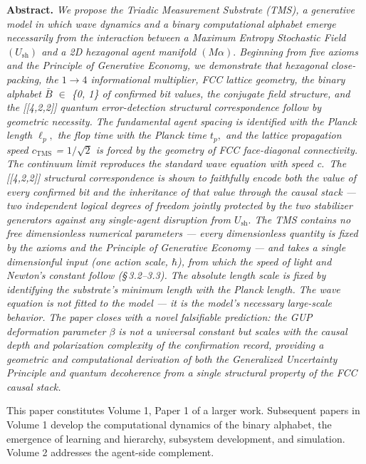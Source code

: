 \documentclass[11pt,oneside]{report}
\theoremstyle{definition}
\theoremstyle{remark}
\newenvironment{paperabstract}
  {\begin{center}\begin{minipage}{0.88\textwidth}\small
   \noindent\textbf{Abstract.}\itshape\space}
  {\end{minipage}\end{center}\vspace{0.4em}}
\begin{document}
\begin{paperabstract}
We propose the Triadic Measurement Substrate (TMS), a generative model
in which wave dynamics and a binary computational alphabet emerge
necessarily from the interaction between a Maximum Entropy Stochastic
Field \ensuremath{(U_{\mathrm{sh}})} and a 2D hexagonal agent manifold \ensuremath{(M\alpha ).} Beginning from five
axioms and the Principle of Generative Economy, we demonstrate that
hexagonal close-packing, the \ensuremath{1\to 4} informational multiplier, FCC lattice
geometry, the binary alphabet \ensuremath{\bar{B}} \ensuremath{\in} \{0, 1\} of confirmed bit values, the
conjugate field structure, and the [[4,2,2]] quantum
error-detection structural correspondence follow by geometric necessity.
The fundamental agent spacing is identified with the Planck length \ensuremath{\ell_{p},}
the flop time with the Planck time \ensuremath{t_{p},} and the lattice propagation speed
\ensuremath{c_{\mathrm{TMS}}} = \ensuremath{1/\sqrt{2}} is forced by the geometry of FCC face-diagonal connectivity.
The continuum limit reproduces the standard wave equation with speed
c.~The [[4,2,2]] structural correspondence is shown to
faithfully encode both the value of every confirmed bit and the
inheritance of that value through the causal stack --- two independent
logical degrees of freedom jointly protected by the two stabilizer
generators against any single-agent disruption from \ensuremath{U_{\mathrm{sh}}.} The TMS
contains no free \emph{dimensionless} numerical parameters --- every
dimensionless quantity is fixed by the axioms and the Principle of
Generative Economy --- and takes a single dimensionful input (one action
scale, \ensuremath{\hbar}), from which the speed of light and Newton's constant follow
(\S\,3.2--3.3). The absolute length scale is fixed by identifying the
substrate's minimum length with the Planck length. The wave equation is
not fitted to the model --- it is the model's necessary large-scale
behavior. The paper closes with a novel falsifiable prediction: the GUP
deformation
parameter \ensuremath{\beta} is not a universal constant but scales with the causal depth
and polarization complexity of the confirmation record, providing a
geometric and computational derivation of both the Generalized
Uncertainty Principle and quantum decoherence from a single structural
property of the FCC causal stack.

This paper constitutes Volume 1, Paper 1 of a larger work. Subsequent
papers in Volume 1 develop the computational dynamics of the binary
alphabet, the emergence of learning and hierarchy, subsystem
development, and simulation. Volume 2 addresses the agent-side
complement.
\end{paperabstract}
\end{document}
